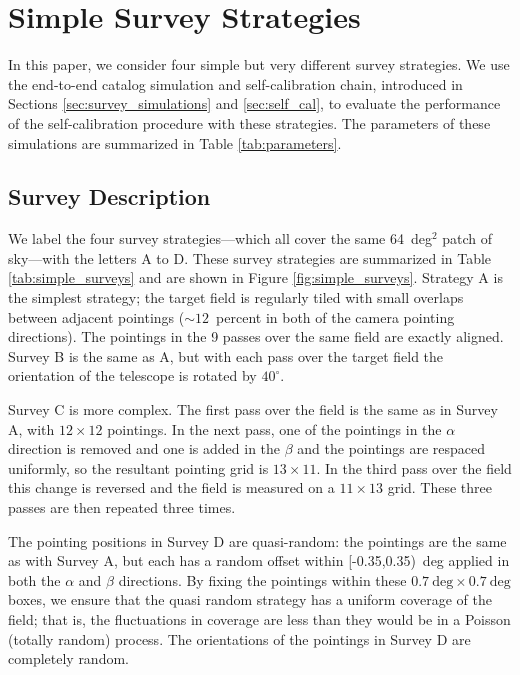 \documentclass[preprint,pdftex]{aastex}
\begin{document}
\section{Simple Survey Strategies}
\label{sec:simple_surveys}
In this paper, we consider four simple but very different survey strategies. We use the end-to-end catalog simulation and self-calibration chain, introduced in Sections \ref{sec:survey_simulations} and \ref{sec:self_cal}, to evaluate the performance of the self-calibration procedure with these strategies. The parameters of these simulations are summarized in Table \ref{tab:parameters}.

\subsection{Survey Description}
We label the four survey strategies---which all cover the same 64~deg$^2$ patch of sky---with the letters A to D. These survey strategies are summarized in Table \ref{tab:simple_surveys} and are shown in Figure \ref{fig:simple_surveys}. Strategy A is the simplest strategy; the target field is regularly tiled with small overlaps between adjacent pointings ($\sim 12$~percent in both of the camera pointing directions). The pointings in the 9 passes over the same field are exactly aligned. Survey B is the same as A, but with each pass over the target field the orientation of the telescope is rotated by $40^\circ$. 

Survey C is more complex. The first pass over the field is the same as in Survey A, with $12 \times 12$ pointings. In the next pass, one of the pointings in the $\alpha$ direction is removed and one is added in the $\beta$ and the pointings are respaced uniformly, so the resultant pointing grid is $13 \times 11$. In the third pass over the field this change is reversed and the field is measured on a $11 \times 13$ grid. These three passes are then repeated three times. 

The pointing positions in Survey D are quasi-random: the pointings are the same as with Survey A, but each has a random offset within [-0.35,0.35)~deg applied in both the $\alpha$ and $\beta$ directions. By fixing the pointings within these $0.7~\text{deg} \times 0.7~\text{deg}$ boxes, we ensure that the quasi random strategy has a uniform coverage of the field; that is, the fluctuations in coverage are less than they would be in a Poisson (totally random) process. The orientations of the pointings in Survey D are completely random. 
\end{document}
